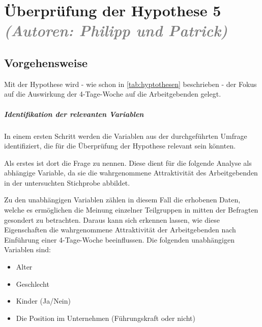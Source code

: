 \chapter{Überprüfung der Hypothese 5 \textit{\textcolor{gray}{(Autoren: Philipp und Patrick)}}}
\label{chap:hypothese5}


\section{Vorgehensweise}
Mit der Hypothese  wird - wie schon in \ref{tab:hyptothesen} beschrieben - der 
Fokus auf die Auswirkung der 4-Tage-Woche auf die Arbeitgebenden gelegt. 

\paragraph{Identifikation der relevanten Variablen}
In einem ersten Schritt werden die Variablen aus der durchgeführten Umfrage identifiziert, die für die 
Überprüfung der Hypothese relevant sein könnten.

Als erstes ist dort die Frage  zu nennen. Diese dient für die folgende Analyse als abhängige 
Variable, da sie die wahrgenommene Attraktivität des Arbeitgebenden in der untersuchten Stichprobe abbildet.

Zu den unabhängigen Variablen zählen in diesem Fall die erhobenen Daten, welche es ermöglichen die Meinung 
einzelner Teilgruppen in mitten der Befragten gesondert zu betrachten. Daraus kann sich erkennen lassen, wie diese
Eigenschaften die wahrgenommene Attraktivität der Arbeitgebenden nach Einführung einer 4-Tage-Woche beeinflussen.
Die folgenden unabhängigen Variablen sind:

\begin{itemize}
  \item Alter
  \item Geschlecht
  \item Kinder (Ja/Nein)
  \item Die Position im Unternehmen (Führungskraft oder nicht)
\end{itemize}

